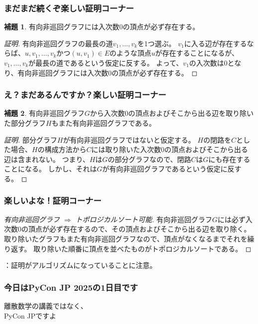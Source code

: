 \documentclass[aspectratio=169,dvipdfmx,12pt,notheorems]{beamer}
\theoremstyle{definition}
\newtheorem{lemma}{補題}
\begin{document}
\begin{frame}\frametitle{まだまだ続くぞ楽しい証明コーナー}

\begin{lemma}
有向非巡回グラフには入次数0の頂点が必ず存在する。
\end{lemma}

\begin{proof}[証明]
有向非巡回グラフの最長の道$v_{1}, \dots, v_{k}$を1つ選ぶ。
$v_{1}$に入る辺が存在するならば、$u, v_{1}, \dots, v_{k}$かつ$(u, v_{1}) \in E$のような頂点$u$が存在することになるが、$v_{1}, \dots, v_{k}$が最長の道であるという仮定に反する。
よって、$v_{1}$の入次数は0となり、有向非巡回グラフには入次数0の頂点が必ず存在する。
\end{proof}

\end{frame}

\begin{frame}\frametitle{え？まだあるんですか？楽しい証明コーナー}

\begin{lemma}
有向非巡回グラフ$G$から入次数0の頂点およびそこから出る辺を取り除いた部分グラフ$H$もまた有向非巡回グラフである。
\end{lemma}

\begin{proof}[証明]
部分グラフ$H$が有向非巡回グラフではないと仮定する。
$H$の閉路を$C$とした場合、$H$の構成方法から$C$には取り除いた入次数0の頂点およびそこから出る辺は含まれない。
つまり、$H$は$G$の部分グラフなので、閉路$C$は$G$にも存在することになる。
しかし、それは$G$が有向非巡回グラフであるという仮定に反する。
\end{proof}

\end{frame}

\begin{frame}\frametitle{楽しいよな！証明コーナー}

\begin{proof}[有向非巡回グラフ $\Rightarrow$ トポロジカルソート可能]
有向非巡回グラフ$G$には必ず入次数0の頂点が必ず存在するので、その頂点およびそこから出る辺を取り除く。
取り除いたグラフもまた有向非巡回グラフなので、頂点がなくなるまでそれを繰り返す。
取り除いた順番に頂点を並べたものがトポロジカルソートである。
\end{proof}
：証明がアルゴリズムになっていることに注意。

\end{frame}

\begin{frame}\frametitle{今日はPyCon JP 2025の1日目です}

\begin{center}
\Huge{離散数学の講義ではなく、 \\ PyCon JPですよ}
\end{center}

\end{frame}
\end{document}
